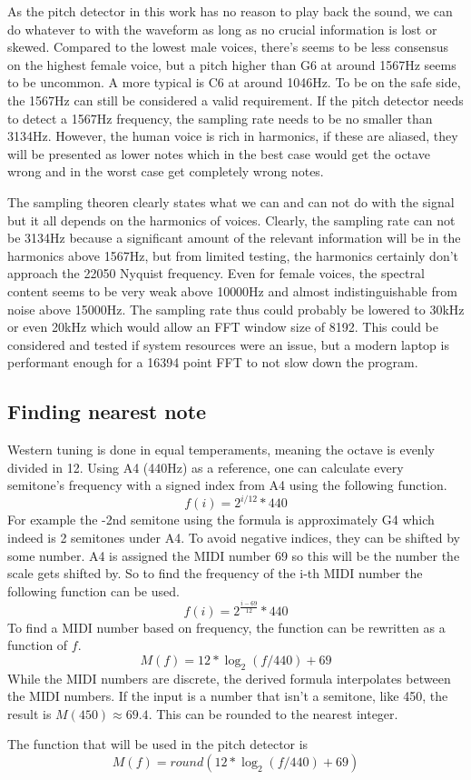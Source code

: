 As the pitch detector in this work has no reason to play back the sound, we can do whatever to with the waveform as long as no crucial information is lost or skewed. Compared to the lowest male voices, there's seems to be less consensus on the highest female voice, but a pitch higher than G6 at around 1567Hz seems to be uncommon. A more typical is C6 at around 1046Hz. To be on the safe side, the 1567Hz can still be considered a valid requirement. If the pitch detector needs to detect a 1567Hz frequency, the sampling rate needs to be no smaller than 3134Hz. However, the human voice is rich in harmonics, if these are aliased, they will be presented as lower notes which in the best case would get the octave wrong and in the worst case get completely wrong notes.

The sampling theoren clearly states what we can and can not do with the signal but it all depends on the harmonics of voices. Clearly, the sampling rate can not be 3134Hz because a significant amount of the relevant information will be in the harmonics above 1567Hz, but from limited testing, the harmonics certainly don't approach the 22050 Nyquist frequency.  Even for female voices, the spectral content seems to be very weak above 10000Hz and almost indistinguishable from noise above 15000Hz. The sampling rate thus could probably be lowered to 30kHz or even 20kHz which would allow an FFT window size of 8192. This could be considered and tested if system resources were an issue, but a modern laptop is performant enough for a 16394 point FFT to not slow down the program.

\subsection{Finding nearest note}
Western tuning is done in equal temperaments, meaning the octave is evenly divided in 12. Using A4 (440Hz) as a reference, one can calculate every semitone's frequency with a signed index from A4 using the following function. 
$$f(i) = 2^{i/12}*440$$
For example the -2nd semitone using the formula is approximately G4 which indeed is 2 semitones under A4. To avoid negative indices, they can be shifted by some number. A4 is assigned the MIDI number 69 so this will be the number the scale gets shifted by. So to find the frequency of the i-th MIDI number the following function can be used.
$$f(i) = 2^{\frac{i-69}{12}}*440$$
To find a MIDI number based on frequency, the function can be rewritten as a function of $f$.
$$M(f) = 12*\log_2(f/440)+69$$
While the MIDI numbers are discrete, the derived formula interpolates between the MIDI numbers. If the input is a number that isn't a semitone, like 450, the result is $M(450) \approx 69.4$. This can be rounded to the nearest integer.

The function that will be used in the pitch detector is
$$M(f) = round(12*\log_2(f/440)+69)$$

